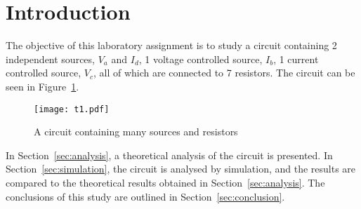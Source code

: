 \section{Introduction}
\label{sec:introduction}

The objective of this laboratory assignment is to study a circuit containing 2 independent sources, $V_a$ and $I_d$, 1 voltage controlled source, $I_b$, 1 current controlled source, $V_c$, all of which are connected to 7 resistors. The circuit can be seen in Figure~\ref{fig1}.

\begin{figure}[h] \centering
\texttt{[image: t1.pdf]}
\caption{A circuit containing many sources and resistors}
\label{fig1}
\end{figure}

In Section~\ref{sec:analysis}, a theoretical analysis of the circuit is
presented. In Section~\ref{sec:simulation}, the circuit is analysed by
simulation, and the results are compared to the theoretical results obtained in
Section~\ref{sec:analysis}. The conclusions of this study are outlined in
Section~\ref{sec:conclusion}.
